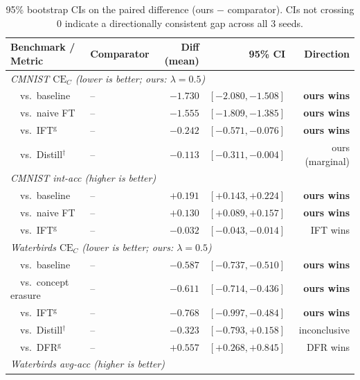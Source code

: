 \documentclass{article}
\newcommand{\CE}{\mathrm{CE}}
\begin{document}
\begin{table}[h]
\centering
\caption{95\% bootstrap CIs on the paired difference (ours $-$ comparator).
  CIs not crossing $0$ indicate a directionally consistent gap across all
  3 seeds.}
\label{tab:stats}
\smallskip\small
\setlength{\tabcolsep}{4pt}
\begin{tabular}{llrrr}
\toprule
\textbf{Benchmark / Metric} & \textbf{Comparator} & \textbf{Diff (mean)} & \textbf{95\% CI} & Direction \\
\midrule
\multicolumn{5}{l}{\textit{CMNIST $\CE_C$ (lower is better; ours: $\lambda{=}0.5$)}} \\
~~vs.\ baseline       & --               & $-1.730$ & $[-2.080, -1.508]$ & \textbf{ours wins} \\
~~vs.\ naive FT       & --               & $-1.555$ & $[-1.809, -1.385]$ & \textbf{ours wins} \\
~~vs.\ IFT$^{\mathrm{g}}$  & --          & $-0.242$ & $[-0.571, -0.076]$ & \textbf{ours wins} \\
~~vs.\ Distill$^{\dagger}$ & --          & $-0.113$ & $[-0.311, -0.004]$ & ours (marginal) \\
\midrule
\multicolumn{5}{l}{\textit{CMNIST int-acc (higher is better)}} \\
~~vs.\ baseline       & --               & $+0.191$ & $[+0.143, +0.224]$ & \textbf{ours wins} \\
~~vs.\ naive FT       & --               & $+0.130$ & $[+0.089, +0.157]$ & \textbf{ours wins} \\
~~vs.\ IFT$^{\mathrm{g}}$  & --          & $-0.032$ & $[-0.043, -0.014]$ & IFT wins \\
\midrule
\multicolumn{5}{l}{\textit{Waterbirds $\CE_C$ (lower is better; ours: $\lambda{=}0.5$)}} \\
~~vs.\ baseline       & --               & $-0.587$ & $[-0.737, -0.510]$ & \textbf{ours wins} \\
~~vs.\ concept erasure & --              & $-0.611$ & $[-0.714, -0.436]$ & \textbf{ours wins} \\
~~vs.\ IFT$^{\mathrm{g}}$  & --          & $-0.768$ & $[-0.997, -0.484]$ & \textbf{ours wins} \\
~~vs.\ Distill$^{\dagger}$ & --          & $-0.323$ & $[-0.793, +0.158]$ & inconclusive \\
~~vs.\ DFR$^{\mathrm{g}}$  & --          & $+0.557$ & $[+0.268, +0.845]$ & DFR wins \\
\midrule
\multicolumn{5}{l}{\textit{Waterbirds avg-acc (higher is better)}} \\

\end{tabular}
\end{table}
\end{document}
